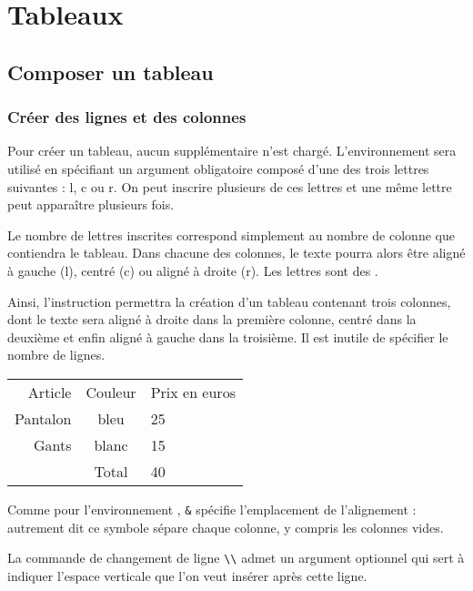 \documentclass[10pt,french,openright,twoside]{book}
\begin{document}
\chapter{Tableaux}

\section{Composer un tableau}
\subsection{Créer des lignes et des colonnes}

Pour créer un tableau, aucun \package supplémentaire n'est chargé.
L'environnement  sera utilisé en spécifiant un argument obligatoire composé d'une des trois lettres suivantes : \ordi l, \ordi c ou \ordi r. On peut inscrire plusieurs de ces lettres et une même lettre peut apparaître plusieurs fois.

Le nombre de lettres inscrites correspond simplement au nombre de colonne que contiendra le tableau. Dans chacune des colonnes, le texte pourra alors être aligné à gauche (\ordi l), centré (\ordi c) ou aligné à droite (\ordi r). Les lettres sont des .

Ainsi, l'instruction  permettra la création d'un tableau contenant trois colonnes, dont le texte sera aligné à droite dans la première colonne, centré dans la deuxième et enfin aligné à gauche dans la troisième. Il est inutile de spécifier le nombre de lignes.\bigskip

{\NewFont
\begin{SideBySideExample}
    \begin{tabular}{rcl}
        Article & Couleur & Prix en euros \\[0.5cm]
        Pantalon & bleu & 25 \\
        Gants & blanc & 15 \\
            & Total & 40
    \end{tabular}
\end{SideBySideExample}
}\bigskip

Comme pour l'environnement , \verb!&! spécifie l'emplacement de l'alignement : autrement dit ce symbole sépare chaque colonne, y compris les colonnes vides.

La commande de changement de ligne \verb!\\! admet un argument optionnel qui sert à indiquer l'espace verticale que l'on veut insérer après cette ligne.
\end{document}
